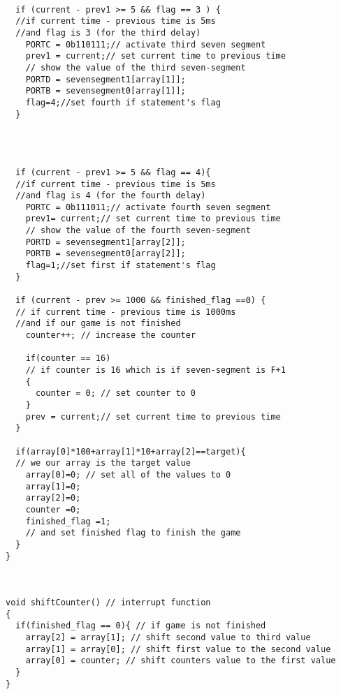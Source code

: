 \documentclass[pdftex,12pt,a4paper]{article}
\begin{document}
\begin{flushleft}
\begin{lstlisting}[language=Arduino]
    
  if (current - prev1 >= 5 && flag == 3 ) {
  //if current time - previous time is 5ms 
  //and flag is 3 (for the third delay)
    PORTC = 0b110111;// activate third seven segment
    prev1 = current;// set current time to previous time
    // show the value of the third seven-segment
    PORTD = sevensegment1[array[1]];
    PORTB = sevensegment0[array[1]];
    flag=4;//set fourth if statement's flag
  }




  if (current - prev1 >= 5 && flag == 4){
  //if current time - previous time is 5ms 
  //and flag is 4 (for the fourth delay)
    PORTC = 0b111011;// activate fourth seven segment
    prev1= current;// set current time to previous time
    // show the value of the fourth seven-segment
    PORTD = sevensegment1[array[2]];
    PORTB = sevensegment0[array[2]];
    flag=1;//set first if statement's flag
  }
  
  if (current - prev >= 1000 && finished_flag ==0) {
  // if current time - previous time is 1000ms 
  //and if our game is not finished
    counter++; // increase the counter
    
    if(counter == 16) 
    // if counter is 16 which is if seven-segment is F+1
    {
      counter = 0; // set counter to 0
    }
    prev = current;// set current time to previous time
  }
  
  if(array[0]*100+array[1]*10+array[2]==target){ 
  // we our array is the target value
    array[0]=0; // set all of the values to 0
    array[1]=0;
    array[2]=0;
    counter =0;
    finished_flag =1; 
    // and set finished flag to finish the game
  }
}



void shiftCounter() // interrupt function
{
  if(finished_flag == 0){ // if game is not finished
    array[2] = array[1]; // shift second value to third value
    array[1] = array[0]; // shift first value to the second value
    array[0] = counter; // shift counters value to the first value
  }
}

 

\end{lstlisting}
\end{flushleft}
\end{document}
